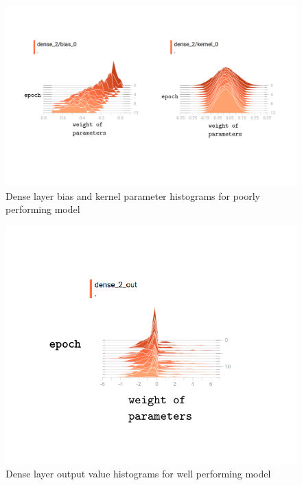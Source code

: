 \documentclass{article}
\begin{document}
{\begin{figure}[h]
  \includegraphics[width=\linewidth]{baddense.pdf}
  \caption{Dense layer bias and kernel parameter histograms for poorly performing model}
  \label{fig:baddenseweights}
\end{figure}

\begin{figure}[h]
  \includegraphics[scale=0.8]{gooddenseout.pdf}
  \caption{Dense layer output value histograms for well performing model}
  \label{fig:gooddenseout}
\end{figure}

}
\end{document}
